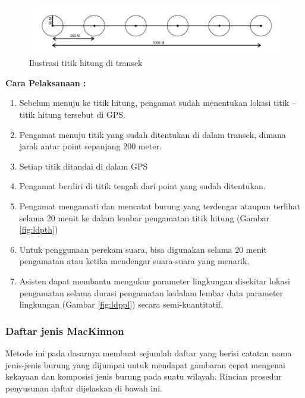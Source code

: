 \documentclass[
]{book}
\providecommand{\tightlist}{%
  \setlength{\itemsep}{0pt}\setlength{\parskip}{0pt}}
\begin{document}
\begin{figure}

{\centering \includegraphics[width=1\linewidth]{images/pc_ilustration} 

}

\caption{Ilustrasi titik hitung di transek}\label{fig:fig1}
\end{figure}

\textbf{Cara Pelaksanaan :}

\begin{enumerate}
\def\labelenumi{\arabic{enumi}.}
\tightlist
\item
  Sebelum menuju ke titik hitung, pengamat sudah menentukan lokasi titik -- titik hitung tersebut di GPS.
\item
  Pengamat menuju titik yang sudah ditentukan di dalam transek, dimana jarak antar point sepanjang 200 meter.
\item
  Setiap titik ditandai di dalam GPS
\item
  Pengamat berdiri di titik tengah dari point yang sudah ditentukan.
\item
  Pengamat mengamati dan mencatat burung yang terdengar ataupun terlihat selama 20 menit ke dalam lembar pengamatan titik hitung (Gambar \ref{fig:ldpth})
\item
  Untuk penggunaan perekam suara, bisa digunakan selama 20 menit pengamatan atau ketika mendengar suara-suara yang menarik.
\item
  Asisten dapat membantu mengukur parameter lingkungan disekitar lokasi pengamatan selama durasi pengamatan kedalam lembar data parameter lingkungan (Gambar \ref{fig:ldppl}) secara semi-kuantitatif.
\end{enumerate}

\hypertarget{daftar-jenis-mackinnon}{%
\subsubsection*{Daftar jenis MacKinnon}\label{daftar-jenis-mackinnon}}

Metode ini pada dasarnya membuat sejumlah daftar yang berisi catatan nama jenis-jenis burung yang dijumpai untuk mendapat gambaran cepat mengenai kekayaan dan komposisi jenis burung pada suatu wilayah. Rincian prosedur penyusunan daftar dijelaskan di bawah ini.
\end{document}
